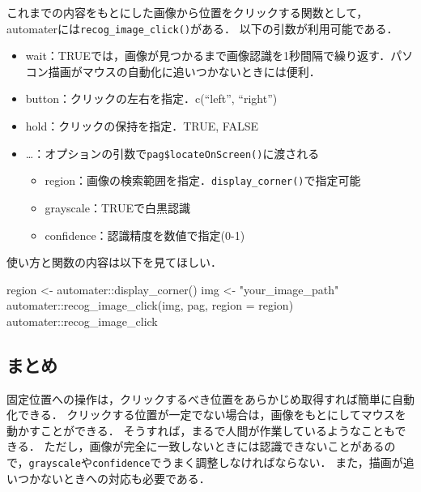 \documentclass[
]{article}
\newenvironment{Shaded}{\begin{snugshade}}{\end{snugshade}}
\newcommand{\AttributeTok}[1]{\textcolor[rgb]{0.77,0.63,0.00}{#1}}
\newcommand{\FunctionTok}[1]{\textcolor[rgb]{0.00,0.00,0.00}{#1}}
\newcommand{\NormalTok}[1]{#1}
\newcommand{\OtherTok}[1]{\textcolor[rgb]{0.56,0.35,0.01}{#1}}
\newcommand{\SpecialCharTok}[1]{\textcolor[rgb]{0.00,0.00,0.00}{#1}}
\newcommand{\StringTok}[1]{\textcolor[rgb]{0.31,0.60,0.02}{#1}}
\providecommand{\tightlist}{%
  \setlength{\itemsep}{0pt}\setlength{\parskip}{0pt}}
\begin{document}
これまでの内容をもとにした画像から位置をクリックする関数として，automaterには\texttt{recog\_image\_click()}がある．
以下の引数が利用可能である．

\begin{itemize}
\tightlist
\item
  wait：TRUEでは，画像が見つかるまで画像認識を1秒間隔で繰り返す．パソコン描画がマウスの自動化に追いつかないときには便利．
\item
  button：クリックの左右を指定．c(``left'', ``right'')
\item
  hold：クリックの保持を指定．TRUE, FALSE\\
\item
  \ldots：オプションの引数で\texttt{pag\$locateOnScreen()}に渡される

  \begin{itemize}
  \tightlist
  \item
    region：画像の検索範囲を指定．\texttt{display\_corner()}で指定可能\\
  \item
    grayscale：TRUEで白黒認識\\
  \item
    confidence：認識精度を数値で指定(0-1)
  \end{itemize}
\end{itemize}

使い方と関数の内容は以下を見てほしい．

\begin{Shaded}
\begin{Highlighting}[]
\NormalTok{region }\OtherTok{\textless{}{-}}\NormalTok{ automater}\SpecialCharTok{::}\FunctionTok{display\_corner}\NormalTok{()}
\NormalTok{img }\OtherTok{\textless{}{-}} \StringTok{"your\_image\_path"}
\NormalTok{automater}\SpecialCharTok{::}\FunctionTok{recog\_image\_click}\NormalTok{(img, pag, }\AttributeTok{region =}\NormalTok{ region)}
\NormalTok{automater}\SpecialCharTok{::}\NormalTok{recog\_image\_click}
\end{Highlighting}
\end{Shaded}

\hypertarget{ux307eux3068ux3081}{%
\subsection{まとめ}\label{ux307eux3068ux3081}}

固定位置への操作は，クリックするべき位置をあらかじめ取得すれば簡単に自動化できる．
クリックする位置が一定でない場合は，画像をもとにしてマウスを動かすことができる．
そうすれば，まるで人間が作業しているようなこともできる．
ただし，画像が完全に一致しないときには認識できないことがあるので，\texttt{grayscale}や\texttt{confidence}でうまく調整しなければならない．
また，描画が追いつかないときへの対応も必要である．
\end{document}
